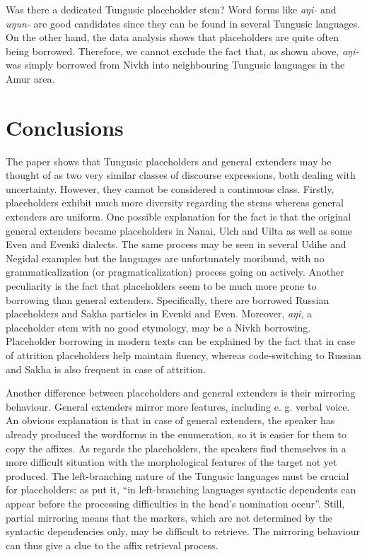 \documentclass[output=paper,colorlinks,citecolor=brown
\ChapterDOI{10.5281/zenodo.15697577}
]{langscibook}
\begin{document}
Was there a dedicated Tungusic placeholder stem? Word forms like \textit{aŋi-} and \textit{uŋun-} are good candidates since they can be found in several Tungusic languages. On the other hand, the data analysis shows that placeholders are quite often being borrowed. Therefore, we cannot exclude the fact that, as shown above, \textit{aŋi-} was simply borrowed from Nivkh into neighbouring Tungusic languages in the Amur area.

\section{Conclusions}

The paper shows that Tungusic placeholders and general extenders may be thought of as two very similar classes of discourse expressions, both dealing with uncertainty. However, they cannot be considered a continuous class. Firstly, placeholders exhibit much more diversity regarding the stems whereas general extenders are uniform. One possible explanation for the fact is that the original general extenders became placeholders in Nanai, Ulch and Uilta as well as some Even and Evenki dialects. The same process may be seen in several Udihe and Negidal examples but the languages are unfortunately moribund, with no grammaticalization (or pragmaticalization) process going on actively. Another peculiarity is the fact that placeholders seem to be much more prone to borrowing than general extenders. Specifically, there are borrowed Russian placeholders and Sakha particles in Evenki and Even. Moreover, \textit{aŋi}, a placeholder stem with no good etymology, may be a Nivkh borrowing. Placeholder borrowing in modern texts can be explained by the fact that in case of attrition placeholders help maintain fluency, whereas code-switching to Russian and Sakha is also frequent in case of attrition. 

Another difference between placeholders and general extenders is their mirroring behaviour. General extenders mirror more features, including e. g. verbal voice. An obvious explanation is that in case of general extenders, the speaker has already produced the wordforms in the enumeration, so it is easier for them to copy the affixes. As regards the placeholders, the speakers find themselves in a more difficult situation with the morphological features of the target not yet produced. The left-branching nature of the Tungusic languages must be crucial for placeholders: as \citet{ganenkov2010interrogatives} put it, ``in left-branching languages syntactic dependents can appear before the processing difficulties in the head’s nomination occur''. Still, partial mirroring means that the markers, which are not determined by the syntactic dependencies only, may be difficult to retrieve. The mirroring behaviour can thus give a clue to the affix retrieval process.
\end{document}
